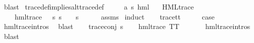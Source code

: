 \begin{isabellebody}
\ blast\isanewline
{}\isamarkupfalse%
%
\endisatagproof
{\isafoldproof}%
%
\isadelimproof
\isanewline
%
\endisadelimproof
\isanewline
{}\isamarkupfalse%
\ trace{\isacharunderscore}{\kern0pt}def{\isacharunderscore}{\kern0pt}implies{\isacharunderscore}{\kern0pt}alt{\isacharunderscore}{\kern0pt}trace{\isacharunderscore}{\kern0pt}def{\isacharcolon}{\kern0pt}\isanewline
\ \ \ {\isasymphi}\ {\isacharcolon}{\kern0pt}{\isacharcolon}{\kern0pt}\ {\isachardoublequoteopen}{\isacharparenleft}{\kern0pt}{\isacharprime}{\kern0pt}a{\isacharcomma}{\kern0pt}\ {\isacharprime}{\kern0pt}s{\isacharparenright}{\kern0pt}\ hml{\isachardoublequoteclose}\isanewline
\ \ \ {\isachardoublequoteopen}HML{\isacharunderscore}{\kern0pt}trace\ {\isasymphi}{\isachardoublequoteclose}\isanewline
\ \ \ {\isachardoublequoteopen}{\isasymexists}{\isasympsi}{\isachardot}{\kern0pt}\ hml{\isacharunderscore}{\kern0pt}trace\ {\isasympsi}\ {\isasymand}\ {\isacharparenleft}{\kern0pt}{\isasymforall}s{\isachardot}{\kern0pt}\ {\isacharparenleft}{\kern0pt}s\ {\isasymTurnstile}\ {\isasymphi}{\isacharparenright}{\kern0pt}\ {\isasymlongleftrightarrow}\ {\isacharparenleft}{\kern0pt}s\ {\isasymTurnstile}\ {\isasympsi}{\isacharparenright}{\kern0pt}{\isacharparenright}{\kern0pt}{\isachardoublequoteclose}\isanewline
%
\isadelimproof
\ \ %
\endisadelimproof
%
\isatagproof
{}\isamarkupfalse%
\ assms\ \isamarkupfalse%
{\isacharparenleft}{\kern0pt}induct{\isacharparenright}{\kern0pt}\isanewline
\ \ \isamarkupfalse%
\ trace{\isacharunderscore}{\kern0pt}tt\isanewline
\ \ \isamarkupfalse%
\ \isamarkupfalse%
\ {\isacharquery}{\kern0pt}case\ \isanewline
\ \ \ \ \isamarkupfalse%
\ hml{\isacharunderscore}{\kern0pt}trace{\isachardot}{\kern0pt}intros{\isacharparenleft}{\kern0pt}{}{\isacharparenright}{\kern0pt}\ \isamarkupfalse%
\ blast\isanewline
{}\isamarkupfalse%
\isanewline
\ \ \isamarkupfalse%
\ {\isacharparenleft}{\kern0pt}trace{\isacharunderscore}{\kern0pt}conj\ {\isasympsi}s{\isacharparenright}{\kern0pt}\isanewline
\ \ \isamarkupfalse%
\ {\isachardoublequoteopen}hml{\isacharunderscore}{\kern0pt}trace\ TT{\isachardoublequoteclose}\ \isanewline
\ \ \ \ \isamarkupfalse%
\ hml{\isacharunderscore}{\kern0pt}trace{\isachardot}{\kern0pt}intros{\isacharparenleft}{\kern0pt}{}{\isacharparenright}{\kern0pt}\ \isamarkupfalse%
\ blast\isanewline

\end{isabellebody}
